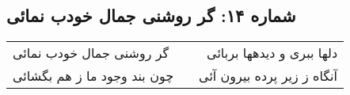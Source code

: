 \begin{center}
\section*{شماره ۱۴: گر روشنی جمال خودب نمائی}
\label{sec:014}
\begin{longtable}{l p{0.5cm} r}
گر روشنی جمال خودب نمائی
&&
دلها ببری و دیدهها بربائی
\\
چون بند وجود ما ز هم بگشائی
&&
آنگاه ز زیر پرده بیرون آئی
\\
\end{longtable}
\end{center}
